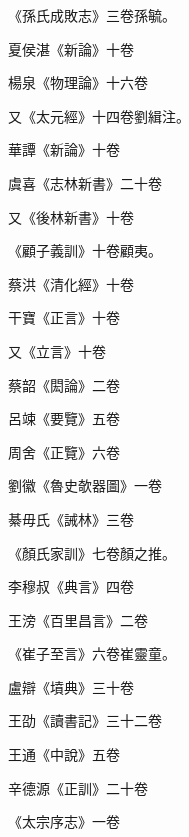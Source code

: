 \begin{pinyinscope}
 《孫氏成敗志》三卷孫毓。



 夏侯湛《新論》十卷



 楊泉《物理論》十六卷



 又《太元經》十四卷劉緝注。



 華譚《新論》十卷



 虞喜《志林新書》二十卷



 又《後林新書》十卷



 《顧子義訓》十卷顧夷。



 蔡洪《清化經》十卷



 干寶《正言》十卷



 又《立言》十卷



 蔡韶《閎論》二卷



 呂竦《要覽》五卷



 周舍《正覽》六卷



 劉徽《魯史欹器圖》一卷



 綦毋氏《誡林》三卷



 《顏氏家訓》七卷顏之推。



 李穆叔《典言》四卷



 王滂《百里昌言》二卷



 《崔子至言》六卷崔靈童。



 盧辯《墳典》三十卷



 王劭《讀書記》三十二卷



 王通《中說》五卷



 辛德源《正訓》二十卷



 《太宗序志》一卷




\end{pinyinscope}

